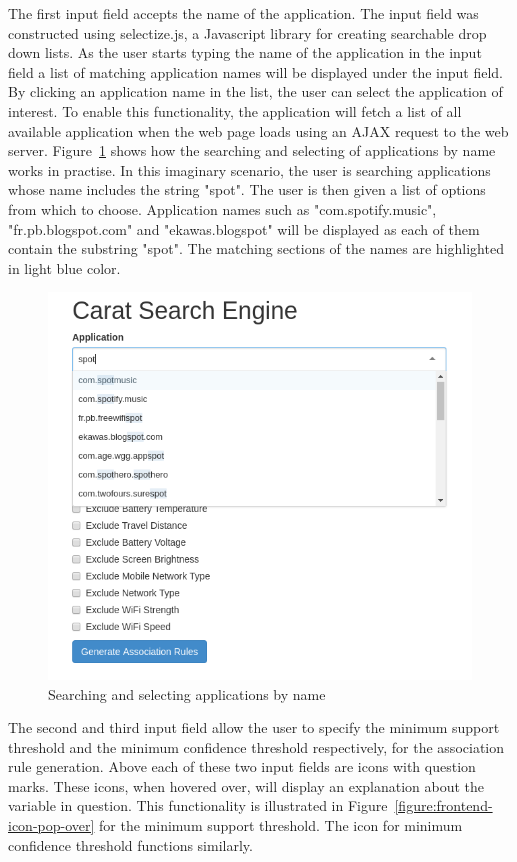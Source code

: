 The first input field accepts the name of the application. The input field was constructed using selectize.js, a Javascript library for creating searchable drop down lists. As the user starts typing the name of the application in the input field a list of matching application names will be displayed under the input field. By clicking an application name in the list, the user can select the application of interest. To enable this functionality, the application will fetch a list of all available application  when the web page loads using an AJAX request to the web server. Figure~\ref{figure:frontend-selectize} shows how the searching and selecting of applications by name works in practise. In this imaginary scenario, the user is searching applications whose name includes the string "spot". The user is then given a list of options from which to choose. Application names such as "com.spotify.music", "fr.pb.blogspot.com" and "ekawas.blogspot" will be displayed as each of them contain the substring "spot". The matching sections of the names are highlighted in light blue color.    

\begin{figure} %
	\centering
	\includegraphics[width=\textwidth]{images/frontend/frontend_selectize.png}
	\caption{Searching and selecting applications by name}
	\label{figure:frontend-selectize}
\end{figure} 

The second and third input field allow the user to specify the minimum support threshold and the minimum confidence threshold respectively, for the association rule generation. Above each of these two input fields are icons with question marks. These icons, when hovered over, will display an explanation about the variable in question. This functionality is illustrated in Figure~\ref{figure:frontend-icon-pop-over} for the minimum support threshold. The icon for minimum confidence threshold functions similarly. 

